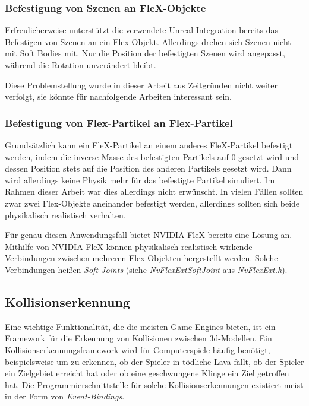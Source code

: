 
\subsubsection{Befestigung von Szenen an FleX-Objekte}

Erfreulicherweise unterstützt die verwendete Unreal Integration bereits das Befestigen von Szenen an ein Flex-Objekt. Allerdings drehen sich Szenen nicht mit Soft Bodies mit. Nur die Position der befestigten Szenen wird angepasst, während die Rotation unverändert bleibt. 


Diese Problemstellung wurde in dieser Arbeit aus Zeitgründen nicht weiter verfolgt, sie könnte für nachfolgende Arbeiten interessant sein.

\subsubsection{Befestigung von Flex-Partikel an Flex-Partikel}

Grundsätzlich kann ein FleX-Partikel an einem anderes FleX-Partikel befestigt werden, indem die inverse Masse des befestigten Partikels auf 0 gesetzt wird und dessen Position stets auf die Position des anderen Partikels gesetzt wird. 
Dann wird allerdings keine Physik mehr für das befestigte Partikel simuliert. %
Im Rahmen dieser Arbeit war dies allerdings nicht erwünscht. In vielen Fällen sollten zwar zwei Flex-Objekte aneinander befestigt werden, allerdings sollten sich beide physikalisch realistisch verhalten. 

Für genau diesen Anwendungsfall bietet NVIDIA FleX bereits eine Lösung an. Mithilfe von NVIDIA FleX können physikalisch realistisch wirkende Verbindungen zwischen mehreren Flex-Objekten hergestellt werden. Solche Verbindungen heißen \textit{Soft Joints} (siehe \textit{NvFlexExtSoftJoint} aus \textit{NvFlexExt.h}).

\subsection{Kollisionserkennung}
\label{physXFleX}

Eine wichtige Funktionalität, die die meisten Game Engines bieten, ist ein Framework für die Erkennung von Kollisionen zwischen 3d-Modellen. 
Ein Kollisionserkennungsframework wird für Computerspiele häufig benötigt, beispielsweise um zu erkennen, ob der Spieler in tödliche Lava fällt, ob der Spieler ein Zielgebiet erreicht hat oder ob eine geschwungene Klinge ein Ziel getroffen hat. Die Programmierschnittstelle für solche Kollisionserkennungen existiert meist in der Form von \textit{Event-Bindings}. 

